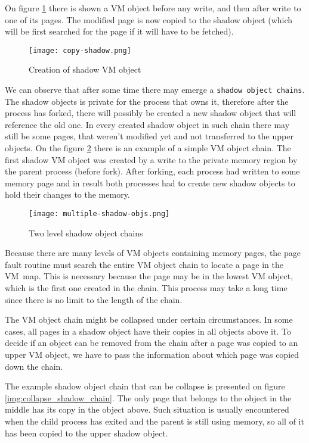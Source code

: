 On figure \ref{img:copy_shadow} there is shown a VM object before any write, and then after write to one of its pages.
The modified page is now copied to the shadow object (which will be first searched for the page if it will have to be fetched).

\begin{figure}
  \centering
  \texttt{[image: copy-shadow.png]}
  \caption{Creation of shadow VM object \cite{cranor}}
  \label{img:copy_shadow}
\end{figure}

We can observe that after some time there may emerge a \texttt{shadow object chains}.
The shadow objects is private for the process that owns it, therefore after the process has forked, there will possibly be
created a new shadow object that will reference the old one.
In every created shadow object in such chain there may still be some pages, that weren't modified yet and not transferred to the upper objects.
On the figure \ref{img:multiple_shadow_objs} there is an example of a simple VM object chain.
The first shadow VM object was created by a write to the private memory region by the parent process (before fork).
After forking, each process had written to some memory page and in result both processes had to create new shadow objects to hold their changes to the memory.

\begin{figure}[h]
  \centering
  \texttt{[image: multiple-shadow-objs.png]}
  \caption{Two level shadow object chains \cite{cranor}}
  \label{img:multiple_shadow_objs}
\end{figure}

Because there are many levels of VM objects containing memory pages,
the page fault routine must search the entire VM object chain to locate a page in the VM~map.
This is necessary because the page may be in the lowest VM object, which is the first one created in the chain.
This process may take a long time since there is no limit to the length of the chain.

The VM object chain might be collapsed under certain circumstances.
In some cases, all pages in a shadow object have their copies in all objects above it.
To decide if an object can be removed from the chain after a page was copied to an upper VM object,
we have to pass the information about which page was copied down the chain.

The example shadow object chain that can be collapse is presented on figure \ref{img:collapse_shadow_chain}.
The only page that belongs to the object in the middle has its copy in the object above.
Such situation is usually encountered when the child process has exited and the parent is still using memory, so all of it has been copied to the upper shadow object.

